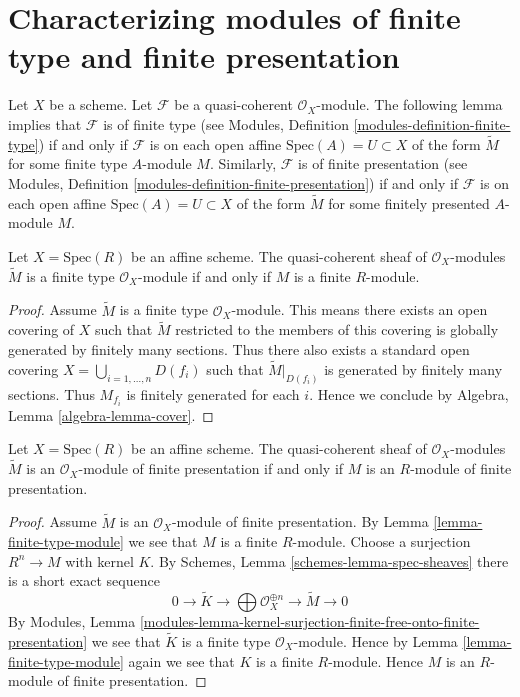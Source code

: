 \section{Characterizing modules of finite type and finite presentation}
\label{section-characterizing-finite-type-presentation}

\noindent
Let $X$ be a scheme.
Let $\mathcal{F}$ be a quasi-coherent $\mathcal{O}_X$-module.
The following lemma implies that $\mathcal{F}$ is of finite type
(see Modules, Definition \ref{modules-definition-finite-type})
if and only if $\mathcal{F}$ is
on each open affine $\text{Spec}(A) = U \subset X$
of the form $\widetilde M$ for some finite type $A$-module $M$.
Similarly, $\mathcal{F}$ is of finite presentation
(see Modules, Definition \ref{modules-definition-finite-presentation})
if and only if $\mathcal{F}$ is
on each open affine $\text{Spec}(A) = U \subset X$
of the form $\widetilde M$ for some finitely presented $A$-module $M$.

\begin{lemma}
\label{lemma-finite-type-module}
Let $X = \text{Spec}(R)$ be an affine scheme.
The quasi-coherent sheaf of $\mathcal{O}_X$-modules
$\widetilde M$ is a finite type $\mathcal{O}_X$-module
if and only if $M$ is a finite $R$-module.
\end{lemma}

\begin{proof}
Assume $\widetilde M$ is a finite type $\mathcal{O}_X$-module.
This means there exists an open covering of $X$ such that
$\widetilde M$ restricted to the members of this covering is
globally generated by finitely many sections.
Thus there also exists a standard open covering
$X = \bigcup_{i = 1, \ldots, n} D(f_i)$ such that $\widetilde M|_{D(f_i)}$
is generated by finitely many sections. Thus $M_{f_i}$ is finitely
generated for each $i$. Hence we conclude by
Algebra, Lemma \ref{algebra-lemma-cover}.
\end{proof}

\begin{lemma}
\label{lemma-finite-presentation-module}
Let $X = \text{Spec}(R)$ be an affine scheme. The quasi-coherent sheaf
of $\mathcal{O}_X$-modules $\widetilde M$ is an $\mathcal{O}_X$-module of
finite presentation if and only if $M$ is an $R$-module of finite presentation.
\end{lemma}

\begin{proof}
Assume $\widetilde M$ is an $\mathcal{O}_X$-module of finite presentation.
By Lemma \ref{lemma-finite-type-module} we see that $M$ is a finite $R$-module.
Choose a surjection $R^n \to M$ with kernel $K$. By
Schemes, Lemma \ref{schemes-lemma-spec-sheaves}
there is a short exact sequence
$$
0 \to \widetilde{K} \to
\bigoplus \mathcal{O}_X^{\oplus n} \to
\widetilde{M} \to 0
$$
By
Modules, Lemma
\ref{modules-lemma-kernel-surjection-finite-free-onto-finite-presentation}
we see that $\widetilde{K}$ is a finite type $\mathcal{O}_X$-module.
Hence by Lemma \ref{lemma-finite-type-module}
again we see that $K$ is a finite $R$-module.
Hence $M$ is an $R$-module of finite presentation.
\end{proof}



